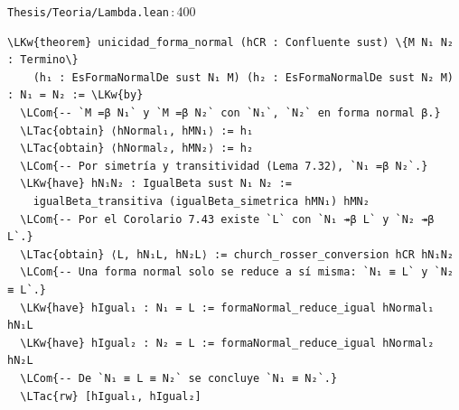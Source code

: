 \documentclass[11pt,a4paper]{article}
\newcommand{\LKw}[1]{\textcolor{kw}{\bfseries #1}}
\newcommand{\LTac}[1]{\textcolor{tac}{\bfseries #1}}
\newcommand{\LCom}[1]{\textcolor{com}{\itshape #1}}
\newcommand{\ruta}[2]{\texttt{#1}\,:\,#2}
\begin{document}
\begin{codigolean}{\ruta{Thesis/Teoria/Lambda.lean}{400}}
\begin{Verbatim}[commandchars=\\\{\}]
\LKw{theorem} unicidad_forma_normal (hCR : Confluente sust) \{M N₁ N₂ : Termino\}
    (h₁ : EsFormaNormalDe sust N₁ M) (h₂ : EsFormaNormalDe sust N₂ M) : N₁ = N₂ := \LKw{by}
  \LCom{-- `M =β N₁` y `M =β N₂` con `N₁`, `N₂` en forma normal β.}
  \LTac{obtain} ⟨hNormal₁, hMN₁⟩ := h₁
  \LTac{obtain} ⟨hNormal₂, hMN₂⟩ := h₂
  \LCom{-- Por simetría y transitividad (Lema 7.32), `N₁ =β N₂`.}
  \LKw{have} hN₁N₂ : IgualBeta sust N₁ N₂ :=
    igualBeta_transitiva (igualBeta_simetrica hMN₁) hMN₂
  \LCom{-- Por el Corolario 7.43 existe `L` con `N₁ ↠β L` y `N₂ ↠β L`.}
  \LTac{obtain} ⟨L, hN₁L, hN₂L⟩ := church_rosser_conversion hCR hN₁N₂
  \LCom{-- Una forma normal solo se reduce a sí misma: `N₁ ≡ L` y `N₂ ≡ L`.}
  \LKw{have} hIgual₁ : N₁ = L := formaNormal_reduce_igual hNormal₁ hN₁L
  \LKw{have} hIgual₂ : N₂ = L := formaNormal_reduce_igual hNormal₂ hN₂L
  \LCom{-- De `N₁ ≡ L ≡ N₂` se concluye `N₁ ≡ N₂`.}
  \LTac{rw} [hIgual₁, hIgual₂]
\end{Verbatim}
\end{codigolean}

\end{document}
